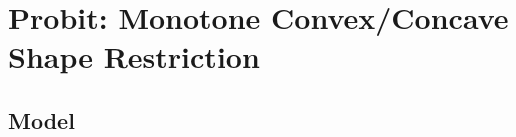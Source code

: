 \documentclass[11pt]{article}
\DeclareMathOperator{\Tr}{Tr}
\newcommand{\opn}{\operatorname}
\begin{document}
\section{Probit: Monotone Convex/Concave Shape Restriction}
\subsection{Model}
\end{document}
